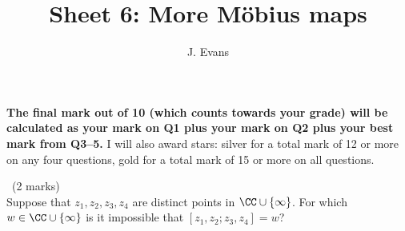 \documentclass[12pt]{article}
\title{Sheet 6: More M\"obius maps}
\author{J. Evans}
\date{}
\begin{document}
\maketitle

\bigskip

{\bf The final mark out of 10 (which counts towards your grade) will be calculated as your mark on Q1 plus your mark on Q2 plus your best mark from Q3--5.} I will also award stars: silver for a total mark of 12 or more on any four questions, gold for a total mark of 15 or more on all questions.

\vspace{1cm}

\begin{question}\ (2 marks)\\
  Suppose that $z_1,z_2,z_3,z_4$ are distinct points in $\CC\cup\{\infty\}$. For which $w\in\CC\cup\{\infty\}$ is it impossible that $[z_1,z_2;z_3,z_4]=w$?
\end{question}

\iffalse
\begin{answer}
  Without loss of generality, we can take $z_1=0$, $z_2=\infty$, $z_4=1$ which gives $w=[0,\infty;z,1]=z$ and $z$ can be anything except $0,1,\infty$.
\end{answer}
\newpage
\fi

\vspace{1cm}
\end{document}
